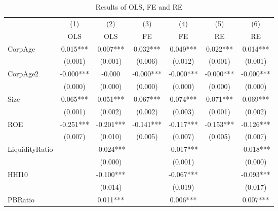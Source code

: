\begin{table}[htbp]\centering
\def\sym#1{\ifmmode^{#1}\else\(^{#1}\)\fi}
\caption{Results of OLS, FE and RE \label{tab:regression}}
\begin{tabular}{l*{6}{c}}
\hline\hline
            &\multicolumn{1}{c}{(1)}&\multicolumn{1}{c}{(2)}&\multicolumn{1}{c}{(3)}&\multicolumn{1}{c}{(4)}&\multicolumn{1}{c}{(5)}&\multicolumn{1}{c}{(6)}\\
            &\multicolumn{1}{c}{OLS}&\multicolumn{1}{c}{OLS}&\multicolumn{1}{c}{FE}&\multicolumn{1}{c}{FE}&\multicolumn{1}{c}{RE}&\multicolumn{1}{c}{RE}\\
\hline
CorpAge     &       0.015***&       0.007***&       0.032***&       0.049***&       0.022***&       0.014***\\
            &     (0.001)   &     (0.001)   &     (0.006)   &     (0.012)   &     (0.001)   &     (0.001)   \\
[1em]
CorpAge2    &      -0.000***&      -0.000   &      -0.000***&      -0.000***&      -0.000***&      -0.000***\\
            &     (0.000)   &     (0.000)   &     (0.000)   &     (0.000)   &     (0.000)   &     (0.000)   \\
[1em]
Size        &       0.065***&       0.051***&       0.067***&       0.074***&       0.071***&       0.069***\\
            &     (0.001)   &     (0.002)   &     (0.002)   &     (0.003)   &     (0.001)   &     (0.002)   \\
[1em]
ROE         &      -0.251***&      -0.201***&      -0.141***&      -0.117***&      -0.153***&      -0.126***\\
            &     (0.007)   &     (0.010)   &     (0.005)   &     (0.007)   &     (0.005)   &     (0.007)   \\
[1em]
LiquidityRatio&               &      -0.024***&               &      -0.017***&               &      -0.018***\\
            &               &     (0.000)   &               &     (0.001)   &               &     (0.000)   \\
[1em]
HHI10       &               &      -0.100***&               &      -0.067***&               &      -0.093***\\
            &               &     (0.014)   &               &     (0.019)   &               &     (0.017)   \\
[1em]
PBRatio     &               &       0.011***&               &       0.006***&               &       0.007***\\

\end{tabular}
\end{table}
